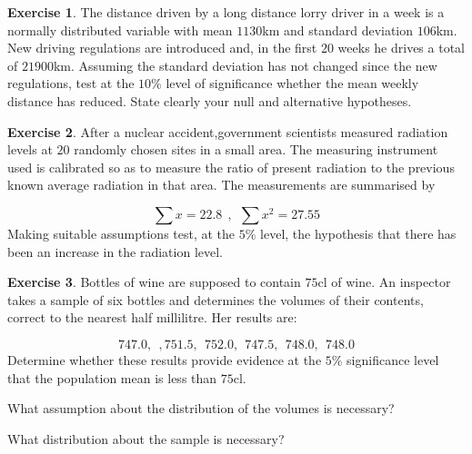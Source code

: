 \documentclass[
]{book}
\theoremstyle{definition}
\theoremstyle{definition}
\theoremstyle{definition}
\newtheorem{exercise}{Exercise}[chapter]
\theoremstyle{definition}
\theoremstyle{remark}
\begin{document}
\begin{exercise}
The distance driven by a long distance lorry driver in a week is a normally distributed variable with mean \(1130\)km and standard deviation \(106\)km. New driving regulations are introduced and, in the first \(20\) weeks he drives a total of \(21900\)km. Assuming the standard deviation has not changed since the new regulations, test at the \(10\%\) level of significance whether the mean weekly distance has reduced. State clearly your null and alternative hypotheses.
\end{exercise}

\begin{exercise}
After a nuclear accident,government scientists measured radiation levels at \(20\) randomly chosen sites in a small area. The measuring instrument used is calibrated so as to measure the ratio of present radiation to the previous known average radiation in that area. The measurements are summarised by

\[\sum x = 22.8 \ \ , \ \ \sum x^2 = 27.55\]
Making suitable assumptions test, at the \(5\%\) level, the hypothesis that there has been an increase in the radiation level.
\end{exercise}

\begin{exercise}
Bottles of wine are supposed to contain \(75\)cl of wine. An inspector takes a sample of six bottles and determines the volumes of their contents, correct to the nearest half millilitre. Her results are:

\[747.0, \ \  ,751.5, \ \ 752.0, \  \ 747.5, \ \ 748.0, \ \ 748.0 \]
Determine whether these results provide evidence at the \(5\%\) significance level that the population mean is less than \(75\)cl.

What assumption about the distribution of the volumes is necessary?

What distribution about the sample is necessary?
\end{exercise}
\end{document}
